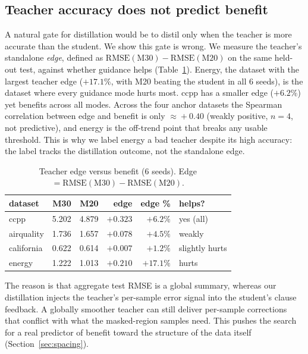 \subsection{Teacher accuracy does not predict benefit}
\label{sec:teacher_edge}

A natural gate for distillation would be to distil only when the teacher is more accurate
than the student. We show this gate is wrong. We measure the teacher's standalone
\textit{edge}, defined as $\mathrm{RMSE}(\text{M30}) - \mathrm{RMSE}(\text{M20})$ on the
same held-out test, against whether guidance helps (Table~\ref{tab:edge}). Energy, the
dataset with the largest teacher edge ($+17.1\%$, with M20 beating the student in all 6
seeds), is the dataset where every guidance mode hurts most. ccpp has a smaller edge
($+6.2\%$) yet benefits across all modes. Across the four anchor datasets the Spearman
correlation between edge and benefit is only $\approx\!+0.40$ (weakly positive, $n=4$, not
predictive), and energy is the off-trend point that breaks any usable threshold. This is
why we label energy a bad teacher despite its high accuracy: the label tracks the
distillation outcome, not the standalone edge.

\begin{table}[t]
\centering
\caption{Teacher edge versus benefit (6 seeds). Edge $=\mathrm{RMSE}(\text{M30})-\mathrm{RMSE}(\text{M20})$.}
\label{tab:edge}
\begin{tabular}{lrrrrl}
\toprule
dataset & M30 & M20 & edge & edge \% & helps? \\
\midrule
ccpp       & 5.202 & 4.879 & $+0.323$ & $+6.2\%$  & yes (all) \\
airquality & 1.736 & 1.657 & $+0.078$ & $+4.5\%$  & weakly \\
california & 0.622 & 0.614 & $+0.007$ & $+1.2\%$  & slightly hurts \\
energy     & 1.222 & 1.013 & $\mathbf{+0.210}$ & $\mathbf{+17.1\%}$ & hurts \\
\bottomrule
\end{tabular}
\end{table}

The reason is that aggregate test RMSE is a global summary, whereas our distillation
injects the teacher's per-sample error signal into the student's clause feedback. A
globally smoother teacher can still deliver per-sample corrections that conflict with what
the masked-region samples need. This pushes the search for a real predictor of benefit
toward the structure of the data itself (Section~\ref{sec:spacing}).
